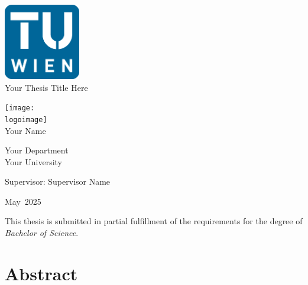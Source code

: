\documentclass[11pt]{report}
\newcommand{\thesistitle}{Your Thesis Title Here}
\newcommand{\authorname}{Your Name}
\newcommand{\supervisor}{Supervisor Name}
\newcommand{\institution}{Your University}
\newcommand{\department}{Your Department}
\newcommand{\logoimage}{graphics/logo.png} %
\newcommand{\submissionmonth}{May}
\newcommand{\submissionyear}{2025}
\begin{document}
\begin{titlepage}
    \centering
    \vspace*{1cm}
    
    \includegraphics[width=0.25\textwidth]{graphics/tuWienLogo.png}
    \\[1cm]
    
    {\Huge \thesistitle\\[1.5cm]}

    \texttt{[image: \\logoimage]}\\[1cm]

    {\Large \authorname\\[0.5cm]}
  
    {\large \department\\
    \institution\\[1.5cm]}
  
    {\large Supervisor: \supervisor\\[2cm]}
  
    {\large \submissionmonth~\submissionyear\\}
  
    \vfill
  
    \vspace*{0.5cm}
    {\small This thesis is submitted in partial fulfillment of the requirements for the degree of \textit{Bachelor of Science}.}
  
  \end{titlepage}

  \chapter*{Abstract}
\end{document}

